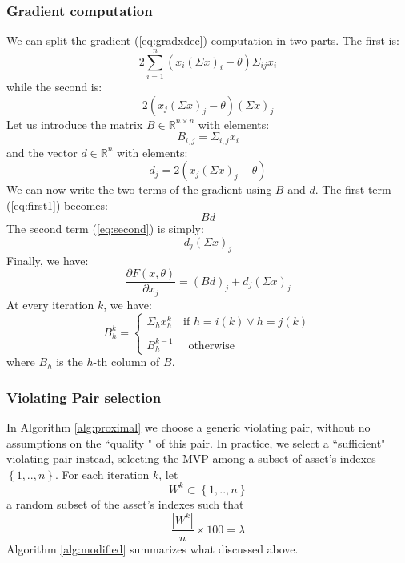 \subsubsection{Gradient computation}
We can split the gradient (\ref{eq:gradxdec}) computation in two parts. The first is:
\begin{equation}\label{eq:first1}
2 \sum_{i=1}^n \left(x_i (\Sigma x)_i - \theta\right)\Sigma_{ij}x_i
\end{equation}
while the second is:
\begin{equation}\label{eq:second}
2(x_j (\Sigma x)_j - \theta)(\Sigma x)_j
\end{equation}
Let us introduce the matrix $B \in \mathbb{R}^{n \times n}$ with elements:
\begin{equation}
B_{i,j} = \Sigma_{i,j}  x_i 
\end{equation}
and the vector $d \in \mathbb{R}^n$ with elements:
\begin{equation}
d_j = 2 (x_j (\Sigma x)_j - \theta) 
\end{equation}
We can now write the two terms of the gradient using $B$ and $d$. The first term (\ref{eq:first1}) becomes:
\begin{equation}
B d
\end{equation}
The second term (\ref{eq:second}) is simply:
\begin{equation}
d_j (\Sigma x)_j
\end{equation}
Finally, we have:
\begin{equation}\label{eq:newgradx}
\frac{\partial F(x,\theta)}{\partial x_j} =\left(B d\right)_j + d_j (\Sigma x)_j
\end{equation}
At every iteration $k$, we have:
\begin{equation}
B^{k}_{h} = \begin{cases}
		  		\Sigma_{h}x_h^{k} \quad \text{if } h = i(k) \vee h = j(k)\\\\
		  	    B^{k-1}_{h} \quad \text{     otherwise}
		  		\end{cases}
\end{equation}
where $B_{h}$ is the $h$-th column of $B$.

\subsubsection{Violating Pair selection}
In Algorithm \ref{alg:proximal} we choose a generic violating pair, without no assumptions on the \textquotedblleft quality " of this pair. In practice, we select a \textquotedblleft sufficient" violating pair instead, selecting the MVP among a subset of asset's indexes $\left\{1,.., n\right\}$. For each iteration $k$, let
\begin{equation}\label{eq:wk}
W^k \subset \left\{1,.., n\right\}
\end{equation}
a random subset of the asset's indexes such that
\begin{equation}\label{eq:wk2}
\frac{|W^k|}{n} \times 100 = \lambda
\end{equation}
Algorithm \ref{alg:modified} summarizes what discussed above.


